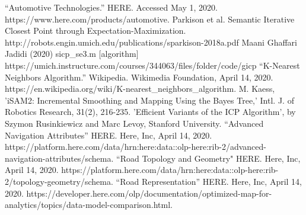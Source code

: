 \documentclass[letterpaper, 10 pt, conference]{ieeeconf}  %
\begin{document}
\addtolength{\textheight}{-12cm}   %





\begin{thebibliography}{99}

 “Automotive Technologies.” HERE. Accessed May 1, 2020. https://www.here.com/products/automotive.
 Parkison et al. Semantic Iterative Closest Point through Expectation-Maximization. http://robots.engin.umich.edu/publications/sparkison-2018a.pdf
 Maani Ghaffari Jadidi (2020) sicp\_se3.m [algorithm] https://umich.instructure.com/courses/344063/files/folder/code/gicp
 “K-Nearest Neighbors Algorithm.” Wikipedia. Wikimedia Foundation, April 14, 2020. https://en.wikipedia.org/wiki/K-nearest\_neighbors\_algorithm.
 M. Kaess, 'iSAM2: Incremental Smoothing and Mapping Using the Bayes Tree,' Intl. J. of Robotics Research, 31(2), 216-235.
'Efficient Variants of the ICP Algorithm', by Szymon Rusinkiewicz and Marc Levoy, Stanford University.
 “Advanced Navigation Attributes” HERE. Here, Inc, April 14, 2020.  https://platform.here.com/data/hrn:here:data::olp-here:rib-2/advanced-navigation-attributes/schema.
 “Road Topology and Geometry" HERE. Here, Inc, April 14, 2020.  https://platform.here.com/data/hrn:here:data::olp-here:rib-2/topology-geometry/schema.
 “Road Representation” HERE. Here, Inc, April 14, 2020.  https://developer.here.com/olp/documentation/optimized-map-for-analytics/topics/data-model-comparison.html.


\end{thebibliography}
\end{document}
